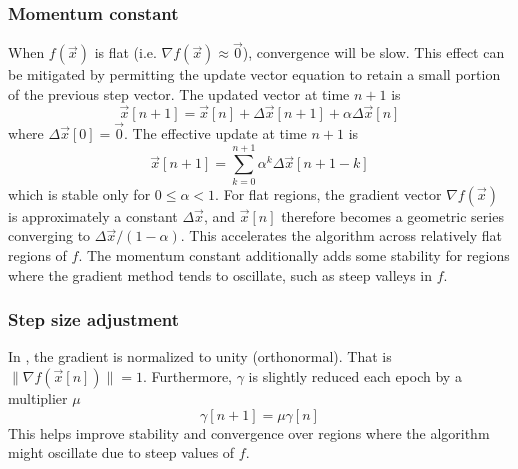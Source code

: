 \subsubsection{Momentum constant}
When $f(\vec{x})$ is flat (i.e. $\nabla f(\vec{x})\approx \vec{0}$),
convergence will be slow.
This effect can be mitigated by permitting the update vector equation to
retain a small portion of the previous step vector.
The updated vector at time $n+1$ is
\[
    \vec{x}[n+1] = \vec{x}[n] + \Delta\vec{x}[n+1] + \alpha\Delta\vec{x}[n]
\]
where $\Delta\vec{x}[0] = \vec{0}$.
The effective update at time $n+1$ is
\[
    \vec{x}[n+1] = 
        \sum_{k=0}^{n+1}{\alpha^{k}\Delta\vec{x}[n+1-k]}
\]
which is stable only for $0 \le \alpha < 1$.
For flat regions, the gradient vector $\nabla f(\vec{x})$ is approximately a
constant $\Delta\vec{x}$, and $\vec{x}[n]$ therefore becomes a geometric
series converging to $\Delta\vec{x}/(1-\alpha)$.
This accelerates the algorithm across relatively flat regions of $f$.
The momentum constant additionally adds some stability for regions where the
gradient method tends to oscillate, such as steep valleys in $f$.

\subsubsection{Step size adjustment}
In \liquid, the gradient is normalized to unity (orthonormal).
That is $\|\nabla f(\vec{x}[n])\|=1$.
Furthermore, $\gamma$ is slightly reduced each epoch by a multiplier $\mu$
\[
    \gamma[n+1] = \mu \gamma[n]
\]
This helps improve stability and convergence over regions where the algorithm
might oscillate due to steep values of $f$.

